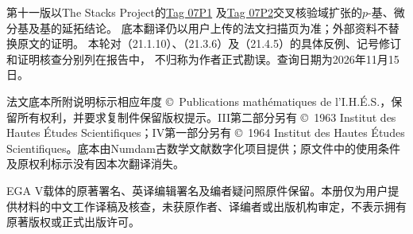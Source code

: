 第十一版以The Stacks Project的\href{https://stacks.math.columbia.edu/tag/07P1}{Tag 07P1}
及\href{https://stacks.math.columbia.edu/tag/07P2}{Tag 07P2}交叉核验域扩张的$p$-基、微分基及基的延拓结论。
底本翻译仍以用户上传的法文扫描页为准；外部资料不替换原文的证明。
本轮对（21.1.10）、（21.3.6）及（21.4.5）的具体反例、记号修订和证明核查分别列在报告中，
不归称为作者正式勘误。查询日期为2026年11月15日。

法文底本所附说明标示相应年度 \copyright\ Publications mathématiques de l'I.H.É.S.，保留所有权利，并要求复制件保留版权提示。III第二部分另有 \copyright\ 1963 Institut des Hautes Études Scientifiques；IV第一部分另有 \copyright\ 1964 Institut des Hautes Études Scientifiques。底本由Numdam古数学文献数字化项目提供；原文件中的使用条件及原权利标示没有因本次翻译消失。

EGA V载体的原著署名、英译编辑署名及编者疑问照原件保留。本册仅为用户提供材料的中文工作译稿及核查，未获原作者、译编者或出版机构审定，不表示拥有原著版权或正式出版许可。
